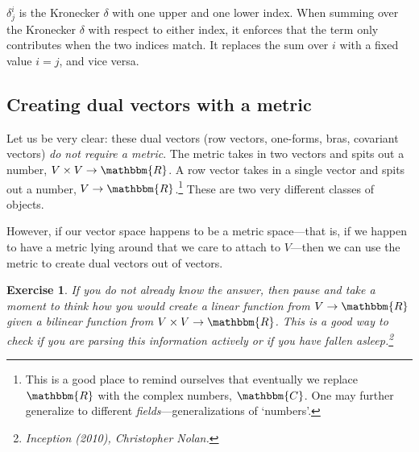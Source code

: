 \documentclass[
  11pt,
	colorful,
	raggedright,
]{tufte-style-thesis-flip}
\newtheorem{exercise}{Exercise}[section]
\begin{document}
$\delta^i_j$ is the Kronecker $\delta$ with one upper and one lower index. When summing over the Kronecker $\delta$ with respect to either index, it enforces that the term only contributes when the two indices match. It replaces the sum over $i$ with a fixed value $i=j$, and vice versa.


\subsection{Creating dual vectors with a metric}

Let us be very clear: these dual vectors (row vectors, one-forms, bras, covariant vectors) \emph{do not require a metric}. The metric takes in two vectors and spits out a number, $V\times V\to \mathbbm{R}$. A row vector takes in a single vector and spits out a number, $V\to\mathbbm{R}$.\footnote{This is a good place to remind ourselves that eventually we replace $\mathbbm{R}$ with the complex numbers, $\mathbbm{C}$. One may further generalize to different \emph{fields}---generalizations of `numbers'.} These are two very different classes of objects. 

However, if our vector space happens to be a metric space---that is, if we happen to have a metric lying around that we care to attach to $V$---then we can use the metric to create dual vectors out of vectors. 
\begin{exercise}
If you do not already know the answer, then pause and take a moment to think how you would create a linear function from $V\to \mathbbm{R}$ given a bilinear function from $V\times V\to \mathbbm{R}$. This is a good way to check if you are parsing this information actively or if you have fallen asleep.\footnote{\emph{Inception} (2010), Christopher Nolan.} 
\end{exercise}
\end{document}
